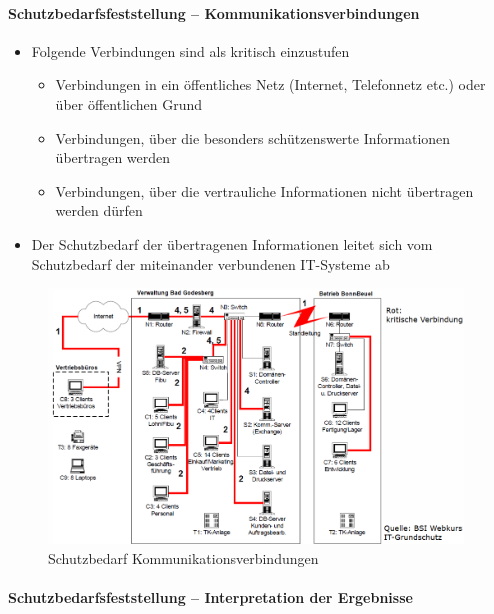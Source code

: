 \documentclass[10pt,a4paper]{article}
\begin{document}
\paragraph*{Schutzbedarfsfeststellung – Kommunikationsverbindungen}
\begin{itemize}[noitemsep,topsep=0pt,leftmargin=*]
    \item Folgende Verbindungen sind als kritisch einzustufen
    \begin{itemize}[noitemsep,topsep=0pt,leftmargin=*]
        \item Verbindungen in ein öffentliches Netz (Internet,
        Telefonnetz etc.) oder über öffentlichen Grund
        \item Verbindungen, über die besonders schützenswerte
        Informationen übertragen werden
        \item Verbindungen, über die vertrauliche Informationen nicht
        übertragen werden dürfen
    \end{itemize}
    \item Der Schutzbedarf der übertragenen Informationen
    leitet sich vom Schutzbedarf der miteinander
    verbundenen IT-Systeme ab
\end{itemize}

\begin{figure}[H]
    \begin{center}
    \includegraphics[width=11cm]{images/Schutzbedarf Kommunikationsverbindungen.png}
    \caption{Schutzbedarf Kommunikationsverbindungen}
    \label{Schutzbedarf Kommunikationsverbindungen}
    \end{center}
\end{figure}

\paragraph*{Schutzbedarfsfeststellung – Interpretation der Ergebnisse}
\end{document}
